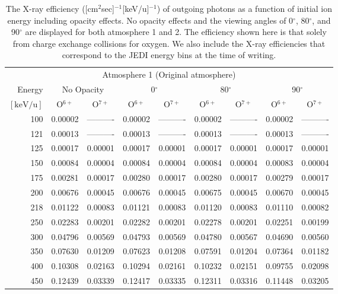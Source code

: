 \begin{table}[ht]
    \centering
    \caption{The X-ray efficiency ([cm$^2$sec]$^{-1}$[keV/u]$^{-1}$) of outgoing photons as a function of initial ion energy including opacity effects. No opacity effects and the viewing angles of 0$^\circ$, 80$^\circ$, and 90$^\circ$ are displayed for both atmosphere 1 and 2. The efficiency shown here is that solely from charge exchange collisions for oxygen. We also include the X-ray efficiencies that correspond to the JEDI energy bins at the time of writing.}
    \begin{tabular}{r|c|c|c|c|c|c|c|c}
    \multicolumn{9}{c}{Atmosphere 1 (Original atmosphere)} \\ \cline{2-9}
    Energy & \multicolumn{2}{c|}{No Opacity} & \multicolumn{2}{c|}{0$^\circ$} & \multicolumn{2}{c|}{80$^\circ$} & \multicolumn{2}{c}{90$^\circ$} \\ \cline{2-9}
    $\mathrm{[keV/u]}$ & O$^{6+}$ & O$^{7+}$ & O$^{6+}$ & O$^{7+}$ & O$^{6+}$ & O$^{7+}$ & O$^{6+}$ & O$^{7+}$ \\ \cline{1-9}
      100 & 0.00002 & ---------- & 0.00002 & ---------- & 0.00002 & ---------- & 0.00002 & ---------- \\
      121 & 0.00013 & ---------- & 0.00013 & ---------- & 0.00013 & ---------- & 0.00013 & ---------- \\
      125 & 0.00017 & 0.00001 & 0.00017 & 0.00001 & 0.00017 & 0.00001 & 0.00017 & 0.00001 \\
      150 & 0.00084 & 0.00004 & 0.00084 & 0.00004 & 0.00084 & 0.00004 & 0.00083 & 0.00004 \\
      175 & 0.00281 & 0.00017 & 0.00280 & 0.00017 & 0.00280 & 0.00017 & 0.00279 & 0.00017 \\
      200 & 0.00676 & 0.00045 & 0.00676 & 0.00045 & 0.00675 & 0.00045 & 0.00670 & 0.00045 \\
      218 & 0.01122 & 0.00083 & 0.01121 & 0.00083 & 0.01120 & 0.00083 & 0.01110 & 0.00082 \\
      250 & 0.02283 & 0.00201 & 0.02282 & 0.00201 & 0.02278 & 0.00201 & 0.02251 & 0.00199 \\
      300 & 0.04796 & 0.00569 & 0.04793 & 0.00569 & 0.04780 & 0.00567 & 0.04690 & 0.00560 \\
      350 & 0.07630 & 0.01209 & 0.07623 & 0.01208 & 0.07591 & 0.01204 & 0.07364 & 0.01182 \\
      400 & 0.10308 & 0.02163 & 0.10294 & 0.02161 & 0.10232 & 0.02151 & 0.09755 & 0.02098 \\
      450 & 0.12439 & 0.03339 & 0.12417 & 0.03335 & 0.12311 & 0.03316 & 0.11448 & 0.03205 \\

\end{tabular}
\end{table}

